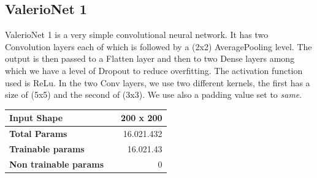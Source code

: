 \documentclass[12pt]{article}
\begin{document}
\subsection{ValerioNet 1}
ValerioNet 1 is a very simple convolutional neural network. It has two Convolution layers each of which is followed by a (2x2) AveragePooling level. The output is then passed to a Flatten layer and then to two Dense layers among which we have a level of Dropout to reduce overfitting. The activation function used is ReLu. In the two Conv layers, we use two different kernels, the first has a size of (5x5) and the second of (3x3). We use also a padding value set to {\em same}.

\bigskip
\begin{tabular}{|ll|r|}
 \hline
 {\bf Input Shape} & & 200 x 200 \\ \hline
 {\bf Total Params} & & 16.021.432 \\ \hline
 {\bf Trainable params} & & 16.021.43 \\ \hline
 {\bf Non trainable params} & & 0 \\ \hline
\end{tabular}
\end{document}
